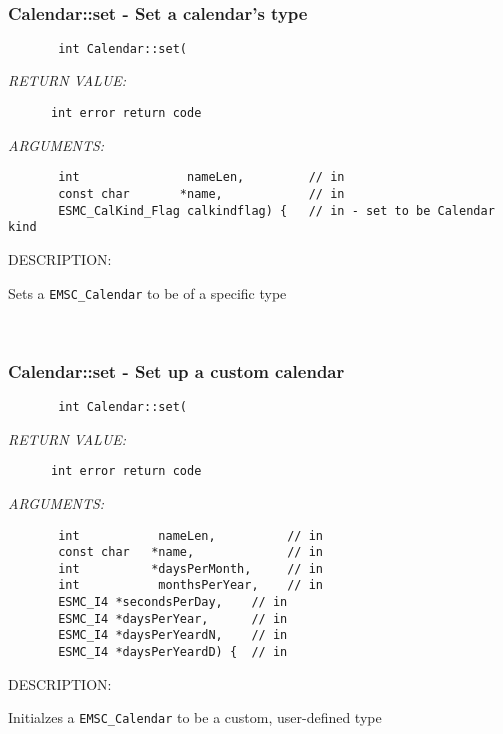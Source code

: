 \mbox{}\hrulefill\ 
 
\subsubsection [Calendar::set] {Calendar::set - Set a calendar's type}


  
\begin{verbatim}       int Calendar::set(\end{verbatim}{\em RETURN VALUE:}
\begin{verbatim}      int error return code\end{verbatim}{\em ARGUMENTS:}
\begin{verbatim}       int               nameLen,         // in
       const char       *name,            // in
       ESMC_CalKind_Flag calkindflag) {   // in - set to be Calendar kind\end{verbatim}
{\sf DESCRIPTION:\\ }


        Sets a {\tt EMSC\_Calendar} to be of a specific type
   
 
\mbox{}\hrulefill\ 
 
\subsubsection [Calendar::set] {Calendar::set - Set up a custom calendar}


  
\begin{verbatim}       int Calendar::set(\end{verbatim}{\em RETURN VALUE:}
\begin{verbatim}      int error return code\end{verbatim}{\em ARGUMENTS:}
\begin{verbatim}       int           nameLen,          // in
       const char   *name,             // in
       int          *daysPerMonth,     // in
       int           monthsPerYear,    // in
       ESMC_I4 *secondsPerDay,    // in
       ESMC_I4 *daysPerYear,      // in
       ESMC_I4 *daysPerYeardN,    // in
       ESMC_I4 *daysPerYeardD) {  // in
   \end{verbatim}
{\sf DESCRIPTION:\\ }


        Initialzes a {\tt EMSC\_Calendar} to be a custom, user-defined type
    
